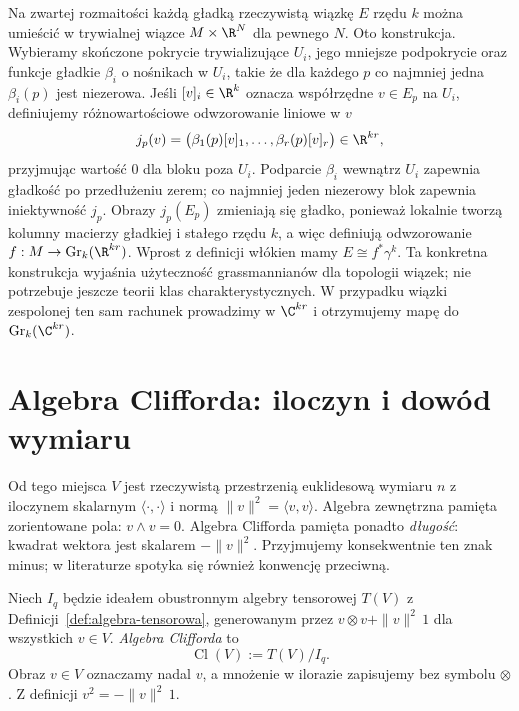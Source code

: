 \begin{uwaga}
Na zwartej rozmaitości każdą gładką rzeczywistą wiązkę $E$
rzędu $k$ można umieścić w trywialnej wiązce
$M\times\R^N$ dla pewnego $N$.
Oto konstrukcja. Wybieramy skończone pokrycie
trywializujące $U_i$, jego mniejsze podpokrycie
oraz funkcje gładkie $\beta_i$ o nośnikach w $U_i$,
takie że dla każdego $p$ co najmniej jedna
$\beta_i(p)$ jest niezerowa. Jeśli $[v]_i\in\R^k$
oznacza współrzędne $v\in E_p$ na $U_i$,
definiujemy różnowartościowe odwzorowanie liniowe w $v$
\[
 j_p(v)=\bigl(\beta_1(p)[v]_1,\ldots,
                  \beta_r(p)[v]_r\bigr)\in\R^{kr},
\]
przyjmując wartość $0$ dla bloku poza $U_i$.
Podparcie $\beta_i$ wewnątrz $U_i$ zapewnia
gładkość po przedłużeniu zerem; co najmniej
jeden niezerowy blok zapewnia iniektywność $j_p$.
Obrazy $j_p(E_p)$ zmieniają się gładko, ponieważ
lokalnie tworzą kolumny macierzy gładkiej i
stałego rzędu $k$, a więc definiują odwzorowanie
$f:M\to\operatorname{Gr}_k(\R^{kr})$.
Wprost z definicji włókien mamy
$E\cong f^*\gamma^k$. Ta konkretna konstrukcja
wyjaśnia użyteczność grassmannianów dla topologii
wiązek; nie potrzebuje jeszcze teorii klas
charakterystycznych.
W przypadku wiązki zespolonej ten sam rachunek
prowadzimy w $\C^{kr}$ i otrzymujemy mapę do
$\operatorname{Gr}_k(\C^{kr})$.
\end{uwaga}

\section{Algebra Clifforda: iloczyn i dowód wymiaru}
\label{sec:clifford}

Od tego miejsca $V$ jest rzeczywistą przestrzenią
euklidesową wymiaru $n$ z iloczynem skalarnym
$\langle\cdot,\cdot\rangle$ i normą
$\|v\|^2=\langle v,v\rangle$. Algebra zewnętrzna
pamięta zorientowane pola: $v\wedge v=0$.
Algebra Clifforda pamięta ponadto \emph{długość}:
kwadrat wektora jest skalarem $-\|v\|^2$.
Przyjmujemy konsekwentnie ten znak minus;
w literaturze spotyka się również konwencję przeciwną.

\begin{definicja}
\label{def:clifford}
Niech $I_q$ będzie ideałem obustronnym algebry
tensorowej $T(V)$ z Definicji~\ref{def:algebra-tensorowa},
generowanym przez
$v\otimes v+\|v\|^2\,1$ dla wszystkich $v\in V$.
\emph{Algebra Clifforda} to
\[
 \operatorname{Cl}(V):=T(V)/I_q.
\]
Obraz $v\in V$ oznaczamy nadal $v$,
a mnożenie w ilorazie zapisujemy bez symbolu $\otimes$.
Z definicji $v^2=-\|v\|^2\,1$.
\end{definicja}

